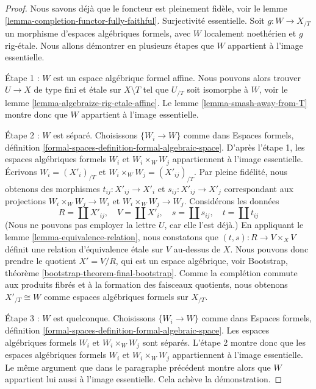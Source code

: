 \begin{proof}
Nous savons déjà que le foncteur est pleinement fidèle, voir le
lemme \ref{lemma-completion-functor-fully-faithful}.
Surjectivité essentielle. Soit $g : W \to X_{/T}$ un morphisme
d'espaces algébriques formels, avec $W$ localement noethérien
et $g$ rig-étale. Nous allons démontrer en plusieurs étapes que $W$
appartient à l'image essentielle.

\medskip\noindent
Étape 1 : $W$ est un espace algébrique formel affine. Nous pouvons alors
trouver $U \to X$ de type fini et étale sur $X \setminus T$ tel que
$U_{/T}$ soit isomorphe à $W$, voir le
lemme \ref{lemma-algebraize-rig-etale-affine}.
Le lemme \ref{lemma-smash-away-from-T} montre donc que $W$
appartient à l'image essentielle.

\medskip\noindent
Étape 2 : $W$ est séparé. Choisissons $\{W_i \to W\}$ comme dans
Espaces formels, définition \ref{formal-spaces-definition-formal-algebraic-space}.
D'après l'étape 1, les espaces algébriques formels $W_i$ et
$W_i \times_W W_j$ appartiennent à l'image essentielle.
Écrivons $W_i = (X'_i)_{/T}$ et $W_i \times_W W_j = (X'_{ij})_{/T}$.
Par pleine fidélité, nous obtenons des morphismes
$t_{ij} : X'_{ij} \to X'_i$ et $s_{ij} : X'_{ij} \to X'_j$ correspondant
aux projections $W_i \times_W W_j \to W_i$ et $W_i \times_W W_j \to W_j$.
Considérons les données
$$
R = \coprod X'_{ij},\quad
V = \coprod X'_i,\quad
s = \coprod s_{ij},\quad
t = \coprod t_{ij}
$$
(Nous ne pouvons pas employer la lettre $U$, car elle l'est déjà.)
En appliquant le lemme \ref{lemma-equivalence-relation}, nous constatons que
$(t, s) : R \to V \times_X V$ définit une relation d'équivalence étale
sur $V$ au-dessus de $X$. Nous pouvons donc prendre le quotient
$X' = V/R$, qui est un espace algébrique, voir
Bootstrap, théorème \ref{bootstrap-theorem-final-bootstrap}.
Comme la complétion commute aux produits fibrés et à la formation des
faisceaux quotients, nous obtenons
$X'_{/T} \cong W$ comme espaces algébriques formels sur $X_{/T}$.

\medskip\noindent
Étape 3 : $W$ est quelconque. Choisissons $\{W_i \to W\}$ comme dans
Espaces formels, définition \ref{formal-spaces-definition-formal-algebraic-space}.
Les espaces algébriques formels $W_i$ et $W_i \times_W W_j$ sont séparés.
L'étape 2 montre donc que les espaces algébriques formels $W_i$ et
$W_i \times_W W_j$ appartiennent à l'image essentielle. Le même argument
que dans le paragraphe précédent montre alors que $W$ appartient lui aussi
à l'image essentielle. Cela achève la démonstration.
\end{proof}

